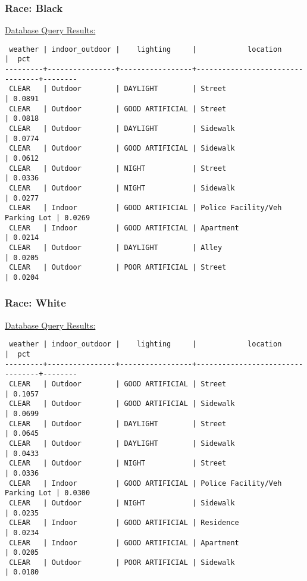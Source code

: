 \documentclass[10pt]{article}
\begin{document}
\subsubsection*{Race: Black}

\underline{Database Query Results:}

\begin{verbatim}
 weather | indoor_outdoor |    lighting     |            location             |  pct
---------+----------------+-----------------+---------------------------------+--------
 CLEAR   | Outdoor        | DAYLIGHT        | Street                          | 0.0891
 CLEAR   | Outdoor        | GOOD ARTIFICIAL | Street                          | 0.0818
 CLEAR   | Outdoor        | DAYLIGHT        | Sidewalk                        | 0.0774
 CLEAR   | Outdoor        | GOOD ARTIFICIAL | Sidewalk                        | 0.0612
 CLEAR   | Outdoor        | NIGHT           | Street                          | 0.0336
 CLEAR   | Outdoor        | NIGHT           | Sidewalk                        | 0.0277
 CLEAR   | Indoor         | GOOD ARTIFICIAL | Police Facility/Veh Parking Lot | 0.0269
 CLEAR   | Indoor         | GOOD ARTIFICIAL | Apartment                       | 0.0214
 CLEAR   | Outdoor        | DAYLIGHT        | Alley                           | 0.0205
 CLEAR   | Outdoor        | POOR ARTIFICIAL | Street                          | 0.0204
\end{verbatim}

\subsubsection*{Race: White}

\underline{Database Query Results:}

\begin{verbatim}
 weather | indoor_outdoor |    lighting     |            location             |  pct
---------+----------------+-----------------+---------------------------------+--------
 CLEAR   | Outdoor        | GOOD ARTIFICIAL | Street                          | 0.1057
 CLEAR   | Outdoor        | GOOD ARTIFICIAL | Sidewalk                        | 0.0699
 CLEAR   | Outdoor        | DAYLIGHT        | Street                          | 0.0645
 CLEAR   | Outdoor        | DAYLIGHT        | Sidewalk                        | 0.0433
 CLEAR   | Outdoor        | NIGHT           | Street                          | 0.0336
 CLEAR   | Indoor         | GOOD ARTIFICIAL | Police Facility/Veh Parking Lot | 0.0300
 CLEAR   | Outdoor        | NIGHT           | Sidewalk                        | 0.0235
 CLEAR   | Indoor         | GOOD ARTIFICIAL | Residence                       | 0.0234
 CLEAR   | Indoor         | GOOD ARTIFICIAL | Apartment                       | 0.0205
 CLEAR   | Outdoor        | POOR ARTIFICIAL | Sidewalk                        | 0.0180
\end{verbatim}
\end{document}
